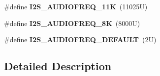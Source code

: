 \begin{DoxyCompactItemize}
\item 
\mbox{\label{group___i2_s___audio___frequency_gad4123d406d056ee5412f2fefc4959813}} 
\#define {\bfseries I2\+S\+\_\+\+A\+U\+D\+I\+O\+F\+R\+E\+Q\+\_\+11K}~(11025\+U)
\item 
\mbox{\label{group___i2_s___audio___frequency_ga111b7c5be04f5d91fbb2ef2bafe755de}} 
\#define {\bfseries I2\+S\+\_\+\+A\+U\+D\+I\+O\+F\+R\+E\+Q\+\_\+8K}~(8000\+U)
\item 
\mbox{\label{group___i2_s___audio___frequency_gaed7cf575d5cae24315f18b38ea83310e}} 
\#define {\bfseries I2\+S\+\_\+\+A\+U\+D\+I\+O\+F\+R\+E\+Q\+\_\+\+D\+E\+F\+A\+U\+LT}~(2\+U)
\end{DoxyCompactItemize}


\subsection{Detailed Description}
